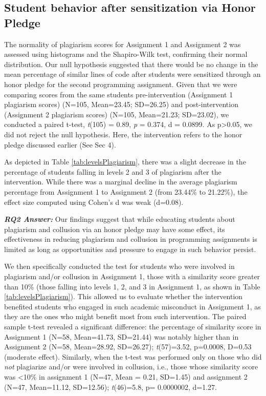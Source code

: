 \subsection{Student behavior after sensitization via Honor Pledge }

The normality of plagiarism scores for Assignment 1 and Assignment 2 was assessed using histograms and the Shapiro-Wilk test, confirming their normal distribution. Our null hypothesis suggested that there would be no change in the mean percentage of similar lines of code after students were sensitized through an honor pledge for the second programming assignment. Given that we were comparing scores from the same students pre-intervention (Assignment 1 plagiarism scores) (N=105, Mean=23.45; SD=26.25) and post-intervention (Assignment 2 plagiarism scores) (N=105, Mean=21.23; SD=23.02), we conducted a paired t-test, \textit{t}(105) = 0.89, \emph{p} = 0.374, d = 0.0899. As p>0.05, we did not reject the null hypothesis. Here, the intervention refers to the honor pledge discussed earlier (See Sec 4).

As depicted in Table \ref{tab:levelsPlagiarism}, there was a slight decrease in the percentage of students falling in levels 2 and 3 of plagiarism after the intervention. While there was a marginal decline in the average plagiarism percentage from Assignment 1 to Assignment 2 (from 23.44\% to 21.22\%), the effect size computed using Cohen's d was weak (d=0.08). 

\vspace{4pt}
\begin{mdframed}
\textbf{\textit{RQ2 Answer:}} Our findings suggest that while educating students about plagiarism and collusion via an honor pledge may have some effect, its effectiveness in reducing plagiarism and collusion in programming assignments is limited as long as opportunities and pressure to engage in such behavior persist.
\end{mdframed}
\vspace{4pt}

We then specifically conducted the test for students who were involved in plagiarism and/or collusion in Assignment 1, those with a similarity score greater than 10\% (those falling into levels 1, 2, and 3 in Assignment 1, as shown in Table \ref{tab:levelsPlagiarism}). This allowed us to evaluate whether the intervention benefited students who engaged in such academic misconduct in Assignment 1, as they are the ones who might benefit most from such intervention. The paired sample t-test revealed a significant difference: the percentage of similarity score in Assignment 1 (N=58, Mean=41.73, SD=21.44) was notably higher than in Assignment 2 (N=58, Mean=28.92, SD=26.27); \textit{t}(57)=3.52, p=0.0008, D=0.53 (moderate effect). Similarly, when the t-test was performed only on those who did \emph{not} plagiarize and/or were involved in collusion, i.e., those whose similarity score was <10\% in assignment 1 (N=47, Mean = 0.21, SD=1.45) and assignment 2 (N=47, Mean=11.12, SD=12.56); \textit{t}(46)=5.8, p= 0.0000002, d=1.27.

